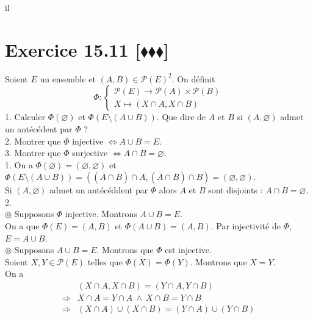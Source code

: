 il\documentclass[10pt]{article}
\begin{document}
\section*{Exercice 15.11 [$\blacklozenge\blacklozenge\blacklozenge$]}
\begin{tcolorbox}[enhanced, width=7.6in, center, size=fbox, fontupper=\large, drop shadow southwest]
    Soient $E$ un ensemble et $(A,B)\in\mathcal{P}(E)^2$. On définit
    \begin{equation*}
        \varPhi : \begin{cases}\mathcal{P}(E) \to \mathcal{P}(A) \times \mathcal{P}(B)\\X \mapsto (X \cap A, X \cap B)\end{cases}
    \end{equation*}
    1. Calculer $\varPhi(\varnothing)$ et $\varPhi(E \setminus (A \cup B))$. Que dire de $A$ et $B$ si $(A, \varnothing)$ admet un antécédent par $\varPhi$ ?\\
    2. Montrer que $\varPhi$ injective $\iff A \cup B = E$.\\
    3. Montrer que $\varPhi$ surjective $\iff A \cap B = \varnothing$.\\[0.2cm]
    1. On a $\varPhi(\varnothing) = (\varnothing, \varnothing)$ et $\varPhi(E \setminus (A \cup B)) = ((\overline{A} \cap \overline{B}) \cap A, (\overline{A} \cap \overline{B}) \cap B) = (\varnothing, \varnothing)$.\\
    Si $(A, \varnothing)$ admet un antécéddent par $\varPhi$ alors $A$ et $B$ sont disjoints : $A \cap B = \varnothing$.\\[0.15cm]
    2.\\
    $\circledcirc$ Supposons $\varPhi$ injective. Montrons $A \cup B = E$.\\
    On a que $\varPhi(E) = (A,B)$ et $\varPhi(A \cup B)=(A,B)$. Par injectivité de $\varPhi$, $E = A \cup B$.\\[0.1cm]
    $\circledcirc$ Supposons $A \cup B = E$. Montrons que $\varPhi$ est injective.\\
    Soient $X,Y \in \mathcal{P}(E)$ telles que $\varPhi(X) = \varPhi(Y)$. Montrons que $X = Y$.\\
    On a
    \begin{align*}
        &(X \cap A, X \cap B) = (Y \cap A, Y \cap B)\\
        \Longrightarrow&X\cap A = Y \cap A ~ \wedge ~ X \cap B = Y \cap B\\
        \Longrightarrow& (X \cap A) \cup (X \cap B) = (Y \cap A) \cup (Y \cap B)\\

\end{align*}
\end{tcolorbox}
\end{document}
